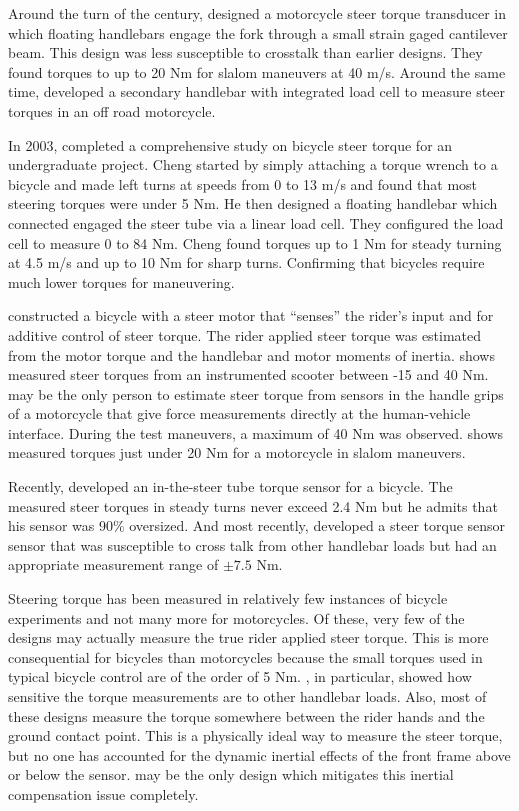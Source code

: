 \documentclass[a4paper]{article}
\begin{document}
Around the turn of the century, \cite{Bortoluzzi2000} designed a motorcycle
steer torque transducer in which floating handlebars engage the fork through a
small strain gaged cantilever beam. This design was less susceptible to
crosstalk than earlier designs. They found torques to up to 20 Nm for slalom
maneuvers at 40 m/s. Around the same time, \cite{James2002} developed a
secondary handlebar with integrated load cell to measure steer torques in an
off road motorcycle.

In 2003, \cite{Cheng2003} completed a comprehensive study on bicycle steer
torque for an undergraduate project. Cheng started by simply attaching a torque
wrench to a bicycle and made left turns at speeds from 0 to 13 m/s and found
that most steering torques were under 5 Nm. He then designed a floating
handlebar which connected engaged the steer tube via a linear load cell. They
configured the load cell to measure 0 to 84 Nm. Cheng found torques up to 1 Nm
for steady turning at 4.5 m/s and up to 10 Nm for sharp turns. Confirming that
bicycles require much lower torques for maneuvering.

\cite{Iuchi2006} constructed a bicycle with a steer motor that ``senses'' the
rider's input and for additive control of steer torque. The rider applied steer
torque was estimated from the motor torque and the handlebar and motor moments
of inertia. \cite{Capitani2006} shows measured steer torques from an
instrumented scooter between -15 and 40 Nm. \cite{Evertse2010} may be the only
person to estimate steer torque from sensors in the handle grips of a
motorcycle that give force measurements directly at the human-vehicle
interface. During the test maneuvers, a maximum of 40 Nm was observed.
\cite{Teerhuis2010} shows measured torques just under 20 Nm for a motorcycle in
slalom maneuvers.

Recently, \cite{Cain2012} developed an in-the-steer tube torque sensor for a
bicycle. The measured steer torques in steady turns never exceed 2.4 Nm but he
admits that his sensor was 90\% oversized. And most recently, \cite{Ouden2011}
developed a steer torque sensor sensor that was susceptible to cross talk from
other handlebar loads but had an appropriate measurement range of $\pm7.5$ Nm.

Steering torque has been measured in relatively few instances of bicycle
experiments and not many more for motorcycles. Of these, very few of the
designs may actually measure the true rider applied steer torque. This is more
consequential for bicycles than motorcycles because the small torques used in
typical bicycle control are of the order of 5 Nm. \cite{Ouden2011}, in
particular, showed how sensitive the torque measurements are to other handlebar
loads. Also, most of these designs measure the torque somewhere between the
rider hands and the ground contact point. This is a physically ideal way to
measure the steer torque, but no one has accounted for the dynamic inertial
effects of the front frame above or below the sensor. \cite{Evertse2010} may be
the only design which mitigates this inertial compensation issue completely.
\end{document}
